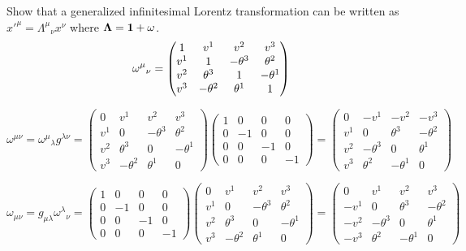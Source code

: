 \documentclass{article}
\begin{document}
Show that a generalized infinitesimal Lorentz transformation can be written as $x'^\mu={\Lambda^\mu}_\nu x^\nu$ where $\vb{\Lambda}=\vb{1}+\vb{\omega}$.
\[ {\vb{\omega}^\mu}_\nu=\begin{pmatrix}1&v^1&v^2&v^3\\v^1&1&-\theta^3&\theta^2\\v^2&\theta^3&1&-\theta^1\\v^3&-\theta^2&\theta^1&1\\
\end{pmatrix}\]







\[\omega^{\mu\nu}={\omega^\mu}_\lambda g^{\lambda\nu}=\begin{pmatrix}0&v^1&v^2&v^3\\v^1&0&-\theta^3&\theta^2\\v^2&\theta^3&0&-\theta^1\\v^3&-\theta^2&\theta^1&0\end{pmatrix}
\begin{pmatrix}1&0&0&0\\0&-1&0&0\\0&0&-1&0\\0&0&0&-1\end{pmatrix}=
\begin{pmatrix}0&-v^1&-v^2&-v^3\\v^1&0&\theta^3&-\theta^2\\v^2&-\theta^3&0&\theta^1\\v^3&\theta^2&-\theta^1&0\end{pmatrix}\]

\[\omega_{\mu\nu}=g_{\mu\lambda}{\omega^\lambda}_\nu =\begin{pmatrix}1&0&0&0\\0&-1&0&0\\0&0&-1&0\\0&0&0&-1\end{pmatrix}
\begin{pmatrix}0&v^1&v^2&v^3\\v^1&0&-\theta^3&\theta^2\\v^2&\theta^3&0&-\theta^1\\v^3&-\theta^2&\theta^1&0\end{pmatrix}=
\begin{pmatrix}0&v^1&v^2&v^3\\-v^1&0&\theta^3&-\theta^2\\-v^2&-\theta^3&0&\theta^1\\-v^3&\theta^2&-\theta^1&0\end{pmatrix}\]
\end{document}
